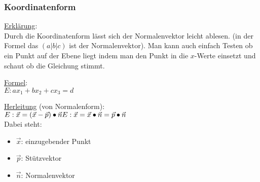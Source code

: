 
\subsubsection{Koordinatenform}
\underline{Erklärung}: \\
Durch die Koordinatenform lässt sich der Normalenvektor leicht ablesen. 
(in der Formel das $(a|b|c)$ ist der Normalenvektor).
Man kann auch einfach Testen ob ein Punkt auf der Ebene liegt indem man den Punkt in die $x$-Werte einsetzt und schaut ob die Gleichung stimmt.
\par
\underline{Formel}: \\
$
E: ax_1 + bx_2 + cx_3 = d
$
\par
\underline{Herleitung} (von Normalenform): \\
$
E: \vec{x} = (\vec{x} - \vec{p}) \bullet \vec{n} \\
E: \vec{x} = \vec{x} \bullet \vec{n} = \vec{p} \bullet \vec{n}
$
\\
Dabei steht: 
\begin{itemize}
    \item $\vec{x}$: einzugebender Punkt
    \item $\vec{p}$: Stützvektor
    \item $\vec{n}$: Normalenvektor
\end{itemize}
